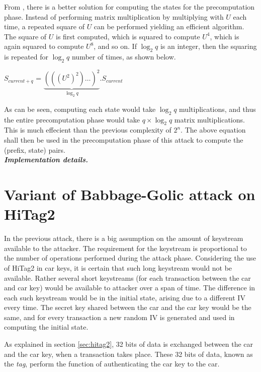 From \cite{erik-discussions}, there is a better solution for computing the states for the precomputation phase. Instead of performing matrix multiplication by multiplying with $U$ each time, a repeated square of $U$ can be performed yielding an efficient algorithm. The square of $U$ is first computed, which is squared to compute $U^4$, which is again squared to compute $U^8$, and so on. If $\log_2{q}$ is an integer, then the squaring is repeated for $\log_2{q}$ number of times, as shown below.

\begin{center}
\large{$S_{current + q}$ = $\underbrace{(((U^2)^2) \dotsc )^2}_{\log_2{q}} . S_{current}$}\\
\end{center}
\label{eq:state-trans}

As can be seen, computing each state would take $\log_2{q}$ multiplications, and thus the entire precomputation phase would take $q \times \log_2{q}$ matrix multiplications. This is much effecient than the previous complexity of $2^n$. The above equation shall then be used in the precomputation phase of this attack to compute the (prefix, state) pairs.\\

\textit{\textbf{Implementation details.}}

\section{Variant of Babbage-Golic attack on HiTag2}
In the previous attack, there is a big assumption on the amount of keystream available to the attacker. The requirement for the keystream is proportional to the number of operations performed during the attack phase. Considering the use of HiTag2 in car keys, it is certain that such long keystream would not be available. Rather several short keystreams (for each transaction between the car and car key) would be available to attacker over a span of time. The difference in each such keystream would be in the initial state, arising due to a different IV every time. The secret key shared between the car and the car key would be the same, and for every transaction a new random IV is generated and used in computing the initial state. 

As explained in section \ref{sec:hitag2}, 32 bits of data is exchanged between the car and the car key, when a transaction takes place. These 32 bits of data, known as the \emph{tag}, perform the function of authenticating the car key to the car. 

